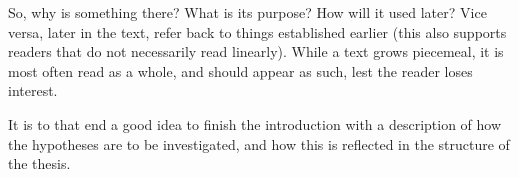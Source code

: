 So, why is something there? What is its purpose? How will it used later?
Vice versa, later in the text, refer back to things established earlier
(this also supports readers that do not necessarily read linearly). While a
text grows piecemeal, it is most often read as a whole, and should appear as
such, lest the reader loses interest.

It is to that end a good idea to finish the introduction with a description
of how the hypotheses are to be investigated, and how this is reflected in
the structure of the thesis.


